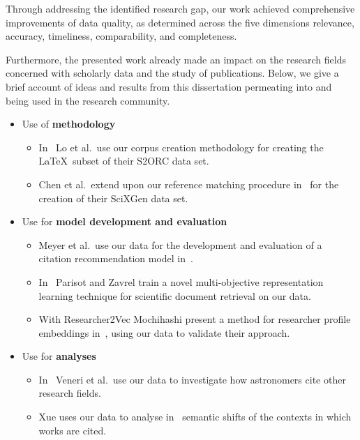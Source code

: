 Through addressing the identified research gap, our work achieved comprehensive improvements of data quality, as determined across the five dimensions relevance, accuracy, timeliness, comparability, and completeness.

Furthermore, the presented work already made an impact on the research fields concerned with scholarly data and the study of publications. Below, we give a brief account of ideas and results from this dissertation permeating into and being used in the research community.

\begin{itemize}
    \item Use of \textbf{methodology}
    \begin{itemize}
        \item In~\cite{Lo2020} Lo et al.\ use our corpus creation methodology for creating the \LaTeX\ subset of their S2ORC data set.
        \item Chen et al.\ extend upon our reference matching procedure in~\cite{Chen2021} for the creation of their SciXGen data set.
    \end{itemize}
    \item Use for \textbf{model development and evaluation}
    \begin{itemize}
        \item Meyer et al.\ use our data for the development and evaluation of a citation recommendation model in~\cite{Citcom2021}. %
        \item In~\cite{Parisot2022} Parisot and Zavrel train a novel multi-objective representation learning technique for scientific document retrieval on our data.
        \item With Researcher2Vec Mochihashi present a method for researcher profile embeddings in~\cite{Mochihashi2023}, using our data to validate their approach.
    \end{itemize}
    \item Use for \textbf{analyses}
    \begin{itemize}
        \item In~\cite{Veneri2022} Veneri et al.\ use our data to investigate how astronomers cite other research fields.
        \item Xue uses our data to analyse in~\cite{Xue2021} semantic shifts of the contexts in which works are cited. %

\end{itemize}
\end{itemize}
